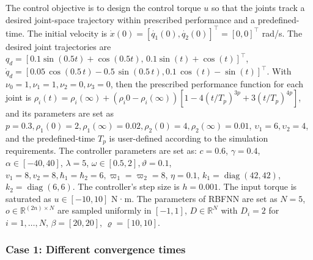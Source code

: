 \documentclass[pdflatex,sn-mathphys-num]{sn-jnl}%
\theoremstyle{thmstyleone}%
\theoremstyle{thmstyletwo}%
\theoremstyle{thmstylethree}%
\begin{document}
The control objective is to design the control torque \( u \) so that the joints track a desired joint-space trajectory within prescribed performance and a predefined-time. The initial velocity is $\dot{x}(0)=[\dot{q_1}(0),\dot{q_2}(0)]^{\top}=[0,0]^{\top}$ rad/s. The desired joint trajectories are \( q_{d} = [ 0.1 \sin(0.5t)+\cos(0.5t), \, 0.1 \sin(t)+\cos(t)]^{\top} \), \( \dot{q}_d = [ 0.05\,\cos\left(0.5\,t\right) - 0.5\,\sin\left(0.5\,t\right), 0.1\,\cos\left(t\right) - \sin\left(t\right)]^{\top} \).
With $\nu_0=1, \nu_1=1, \nu_2=0, \nu_3=0$, then the prescribed performance function for each joint is $\rho_i(t) = \rho_i(\infty ) + \left(\rho_i{0} - \rho_i(\infty )\right) [1 - 4\left({t}/{T_{p}}\right)^{3p} + 3\left({t}/{T_{p}}\right)^{4p}]$, and its parameters are set as $p=0.3, \rho_1(0)=2, \rho_1(\infty )=0.02,\rho_2(0)=4, \rho_2(\infty )=0.01$, $\upsilon_{1}=6, \upsilon_{2}=4$, and the predefined-time $T_p$ is user-defined according to the simulation requirements. 
The controller parameters are set as: $c=0.6$, $\gamma=0.4$, $\alpha \in [-40,40]$, $\lambda=5$, $\omega \in [0.5, 2], \vartheta=0.1$, $v_{1}=8, v_{2}=8, \hbar_1=\hbar_2=6, \varpi_1=\varpi_2=8$, $\eta=0.1$, $k_1 = \operatorname{diag}(42,42)$, $k_2 = \operatorname{diag}(6,6)$. The controller's step size is $h=0.001$. The input torque is saturated as $u\in[-10,10]$ N·m.
The parameters of RBFNN are set as $N=5$, $o\in\mathbb{R}^{(2n)\times N}$ are sampled uniformly in $[-1,1]$, $D\in\mathbb{R}^N$ with $D_i=2$ for $i=1,\dots,N$, $\beta =[20,20]$, $ \varrho  =[10,10]$.





\subsubsection*{Case 1: Different convergence times}

\end{document}
